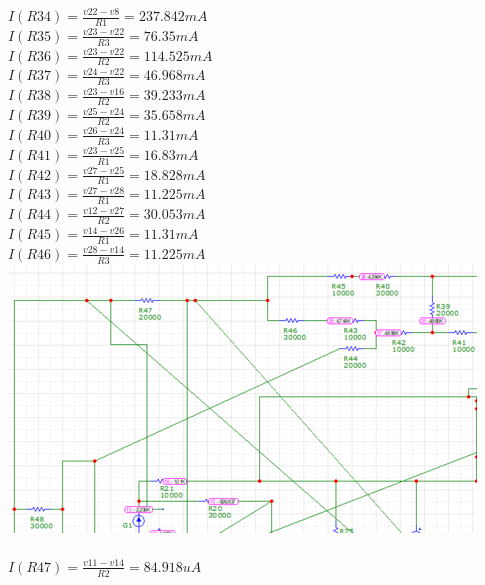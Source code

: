 \documentclass{article}
\begin{document}
$I(R34) = \frac{v22-v8}{R1} = 237.842m A$\\ 
$I(R35) = \frac{v23-v22}{R3} = 76.35m A$\\ 
$I(R36) = \frac{v23-v22}{R2} = 114.525m A$\\ 
$I(R37) = \frac{v24-v22}{R3} = 46.968m A$\\ 
$I(R38) = \frac{v23-v16}{R2} = 39.233m A$\\ 
$I(R39) = \frac{v25-v24}{R2} = 35.658m A$\\ 
$I(R40) = \frac{v26-v24}{R3} = 11.31m A$\\ 
$I(R41) = \frac{v23-v25}{R1} = 16.83m A$\\ 
$I(R42) = \frac{v27-v25}{R1} = 18.828m A$\\ 
$I(R43) = \frac{v27-v28}{R1} = 11.225m A$\\ 
$I(R44) = \frac{v12-v27}{R2} = 30.053m A$\\ 
$I(R45) = \frac{v14-v26}{R1} = 11.31m A$\\ 
$I(R46) = \frac{v28-v14}{R3} = 11.225m A$\\ 
\includegraphics[]{images/MicroCap5_67.PNG}\\ \\
$I(R47) = \frac{v11-v14}{R2} = 84.918u A$\\ 
\end{document}
